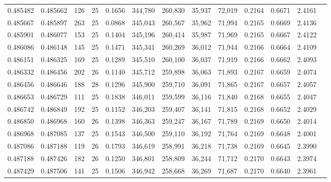 \begin{tabular}{rrrrrrrrrrrrr}
0.485482 & 0.485662 &   126 &  25 &                                     0.1656 & 344,780 & 260,830 &  35,937 &  72,019 & 0.2164 & 0.6671 & 2.4161 \\
0.485667 & 0.485897 &   263 &  25 &                                     0.0868 & 345,043 & 260,567 &  35,962 &  71,994 & 0.2165 & 0.6669 & 2.4136 \\
0.485901 & 0.486077 &   153 &  25 &                                     0.1404 & 345,196 & 260,414 &  35,987 &  71,969 & 0.2165 & 0.6667 & 2.4122 \\
0.486086 & 0.486148 &   145 &  25 &                                     0.1471 & 345,341 & 260,269 &  36,012 &  71,944 & 0.2166 & 0.6664 & 2.4109 \\
0.486151 & 0.486325 &   169 &  25 &                                     0.1289 & 345,510 & 260,100 &  36,037 &  71,919 & 0.2166 & 0.6662 & 2.4093 \\
0.486332 & 0.486456 &   202 &  26 &                                     0.1140 & 345,712 & 259,898 &  36,063 &  71,893 & 0.2167 & 0.6659 & 2.4074 \\
0.486456 & 0.486646 &   188 &  28 &                                     0.1296 & 345,900 & 259,710 &  36,091 &  71,865 & 0.2167 & 0.6657 & 2.4057 \\
0.486653 & 0.486729 &   111 &  25 &                                     0.1838 & 346,011 & 259,599 &  36,116 &  71,840 & 0.2168 & 0.6655 & 2.4047 \\
0.486742 & 0.486849 &   192 &  25 &                                     0.1152 & 346,203 & 259,407 &  36,141 &  71,815 & 0.2168 & 0.6652 & 2.4029 \\
0.486850 & 0.486968 &   160 &  26 &                                     0.1398 & 346,363 & 259,247 &  36,167 &  71,789 & 0.2169 & 0.6650 & 2.4014 \\
0.486968 & 0.487085 &   137 &  25 &                                     0.1543 & 346,500 & 259,110 &  36,192 &  71,764 & 0.2169 & 0.6648 & 2.4001 \\
0.487086 & 0.487188 &   119 &  26 &                                     0.1793 & 346,619 & 258,991 &  36,218 &  71,738 & 0.2169 & 0.6645 & 2.3990 \\
0.487188 & 0.487426 &   182 &  26 &                                     0.1250 & 346,801 & 258,809 &  36,244 &  71,712 & 0.2170 & 0.6643 & 2.3974 \\
0.487429 & 0.487506 &   141 &  25 &                                     0.1506 & 346,942 & 258,668 &  36,269 &  71,687 & 0.2170 & 0.6640 & 2.3961 \\

\end{tabular}
